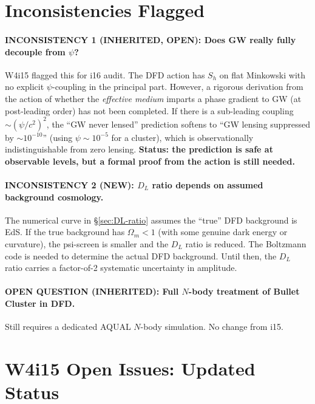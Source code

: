 \documentclass[11pt,a4paper]{article}
\begin{document}
\section{Inconsistencies Flagged}

\paragraph{INCONSISTENCY 1 (INHERITED, OPEN): Does GW really fully decouple
from $\psi$?}
W4i15 flagged this for i16 audit.  The DFD action has $S_h$ on flat
Minkowski with no explicit $\psi$-coupling in the principal part.
However, a rigorous derivation from the action of whether the
\emph{effective medium} imparts a phase gradient to GW (at post-leading
order) has not been completed.  If there is a sub-leading coupling
$\sim (\psi/c^2)^2$, the ``GW never lensed'' prediction softens to
``GW lensing suppressed by $\sim 10^{-10}$'' (using $\psi \sim 10^{-5}$
for a cluster), which is observationally indistinguishable from zero
lensing.  \textbf{Status: the prediction is safe at observable levels,
but a formal proof from the action is still needed.}

\paragraph{INCONSISTENCY 2 (NEW): $D_L$ ratio depends on assumed
background cosmology.}
The numerical curve in \S\ref{sec:DL-ratio} assumes the ``true'' DFD
background is EdS.  If the true background has $\Omega_m < 1$ (with
some genuine dark energy or curvature), the psi-screen is smaller and
the $D_L$ ratio is reduced.  The Boltzmann code is needed to determine
the actual DFD background.  Until then, the $D_L$ ratio carries a
factor-of-2 systematic uncertainty in amplitude.

\paragraph{OPEN QUESTION (INHERITED): Full $N$-body treatment of
Bullet Cluster in DFD.}
Still requires a dedicated AQUAL $N$-body simulation.  No change
from i15.


\section{W4i15 Open Issues: Updated Status}
\end{document}
